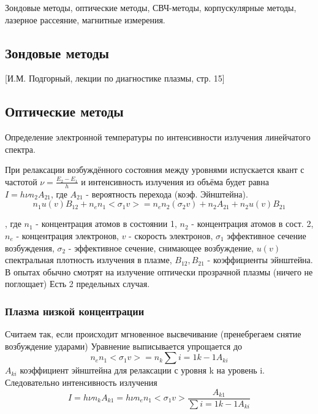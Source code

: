 \documentclass[10pt, a4paper]{article}
\numberwithin{equation}{section}
\begin{document}
Зондовые методы, оптические методы, СВЧ-методы, корпускулярные методы, лазерное рассеяние, магнитные измерения.

\subsection{Зондовые методы}
\label{11.1}

[И.М. Подгорный, лекции по диагностике плазмы, стр. 15]

\subsection{Оптические методы}
\label{11.2}

Определение электронной температуры по интенсивности излучения линейчатого спектра.

При релаксации возбуждённого состояния между уровнями испускается квант с частотой $\nu=\frac{E_2-E_1}{h}$ и интенсивность излучения из объёма будет равна $I=h\nu n_{2} A_{21}$, где $A_{21}$ - вероятность перехода (коэф. Эйнштейна).
\begin{equation}
	n_1 u(v)B_{12}+n_e n_1 <\sigma_1 v>=n_e n_2 (\sigma_2 v) + n_2 A_{21}+n_2 u(v) B_{21}
\end{equation}

, где $n_1$ - концентрация атомов в состоянии 1, $n_2$ - концентрация атомов в сост. 2, $n_e$ - концентрация электронов, $v$ - скорость электронов, $\sigma_1$ эффективное сечение возбуждения, $\sigma_2$ - эффективное сечение, снимающее возбуждение, $u(v)$ спектральная плотность излучения в плазме, $B_{12}, B_{21}$ - коэффициенты эйнштейна. В опытах обычно смотрят на излучение оптически прозрачной плазмы (ничего не поглощает) Есть 2 предельных случая.

\subsubsection{Плазма низкой концентрации}
\label{11.2.1}
Считаем так, если происходит мгновенное высвечивание (пренебрегаем снятие возбуждение ударами)
Уравнение выписывается упрощается до 
\begin{equation}
	n_e n_1 <\sigma_1 v>= n_k  \sum {i=1}{k-1}A_{k i}
\end{equation}
$A_{k i}$ коэффициент эйнштейна для релаксации с уровня k на уровень i.
Следовательно интенсивность излучения 
\begin{equation}
	I=h \nu n_k A_{k1}=h \nu n_e n_1 <\sigma_1 v>\frac{A_{k1}}{\sum{i=1}{k-1} A_{ki}}
\end{equation}
\end{document}
